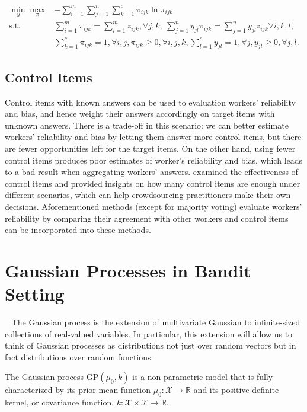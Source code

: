 \documentclass{article}
\begin{document}
\begin{align}
\min_{y}\max_{\pi} & -\sum_{i=1}^{m}\sum_{j=1}^{n}\sum_{k=1}^{c} \pi_{ijk}
\ln \pi_{ijk} \nonumber \\
  \mathrm{s.t.} & \sum_{i=1}^{m}\pi_{ijk} = \sum_{i=1}^{m}z_{ijk},
                  \forall j,k, ~ \sum_{j=1}^{n}y_{jl}\pi_{ijk} =
                  \sum_{j=1}^{n}y_{jl}z_{ijk} \forall i,k,l, \nonumber
  \\
  & \sum_{k=1}^{c}\pi_{ijk}=1, \forall i,j, \pi_{ijk} \geq 0, \forall
    i,j,k, \sum_{l=1}^{c}y_{jl}=1, \forall j, y_{jl} \geq 0, \forall
    j, l. \label{eq:minimax_entropy}
\end{align}

\subsection{Control Items}
Control items with known answers can be used to evaluation workers'
reliability and bias, and hence weight their answers accordingly on target
items with unknown answers. There is a trade-off in this
scenario: we can better estimate workers' reliability and bias by
letting them answer more control items, but there are fewer
opportunities left for the
target items. On the other hand, using fewer control items produces poor
estimates of worker's reliability and bias, which leads to a bad
result when aggregating workers' answers. \cite{Liu2013-ck} examined
the effectiveness of control items and provided insights on how many control items are enough under
different scenarios, which can help crowdsourcing practitioners make
their own decisions. Aforementioned methods
(except for majority voting) evaluate workers' reliability by
comparing their agreement with other workers and control items can be
incorporated into these methods.

\section{Gaussian Processes in Bandit Setting}~\label{sect:gp}
The Gaussian process is the extension of multivariate Gaussian to infinite-sized collections of real-valued variables. In particular, this extension will allow us to think of Gaussian processes as distributions not just over random vectors but in fact distributions over random functions.

The Gaussian process $\mathrm{GP}(\mu_0,k)$ is a non-parametric model
that is fully characterized by its prior mean function $\mu_0 :
\mathcal{X}\rightarrow \mathbb{R}$ and its positive-definite kernel,
or covariance function, $k: \mathcal{X} \times \mathcal{X} \rightarrow
\mathbb{R}$.
\end{document}
